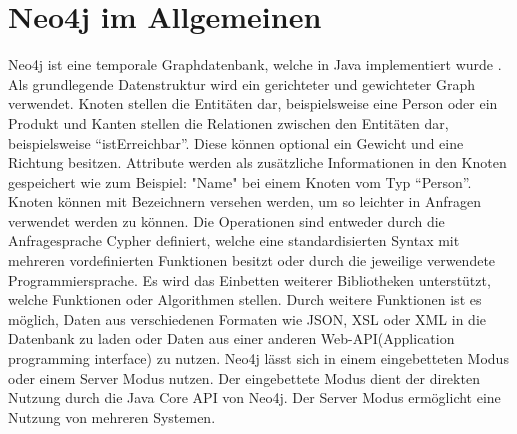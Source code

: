 \section{Neo4j im Allgemeinen}

Neo4j ist eine temporale Graphdatenbank, welche in Java implementiert wurde \parencite{vukotic2015neo4j}. Als grundlegende Datenstruktur wird ein gerichteter und gewichteter Graph verwendet. Knoten stellen die Entitäten dar, beispielsweise eine Person oder ein Produkt und  Kanten stellen die Relationen zwischen den Entitäten dar, beispielsweise “istErreichbar”. Diese können optional ein Gewicht und eine Richtung besitzen. Attribute werden als zusätzliche Informationen in den Knoten gespeichert wie zum Beispiel: "Name" bei einem Knoten vom Typ “Person”. Knoten können mit Bezeichnern versehen werden, um so leichter in Anfragen  verwendet werden zu können. Die Operationen sind entweder durch die  Anfragesprache  Cypher definiert, welche eine standardisierten Syntax mit  mehreren vordefinierten Funktionen besitzt oder durch die jeweilige verwendete Programmiersprache. Es wird das Einbetten weiterer Bibliotheken unterstützt, welche  Funktionen oder Algorithmen stellen. Durch weitere Funktionen ist es möglich, Daten aus verschiedenen Formaten wie JSON, XSL oder XML in die Datenbank zu laden oder Daten aus einer anderen Web-API(Application programming interface) zu nutzen. Neo4j lässt sich in einem  eingebetteten Modus oder einem  Server Modus nutzen. Der eingebettete Modus dient der direkten  Nutzung durch die Java Core API von Neo4j. Der Server Modus ermöglicht eine Nutzung von mehreren Systemen. 

